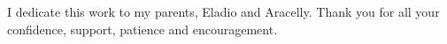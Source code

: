 \begin{center}
I dedicate this work to my parents, Eladio and Aracelly. Thank you for all your confidence, support, patience and encouragement.
\end{center}
